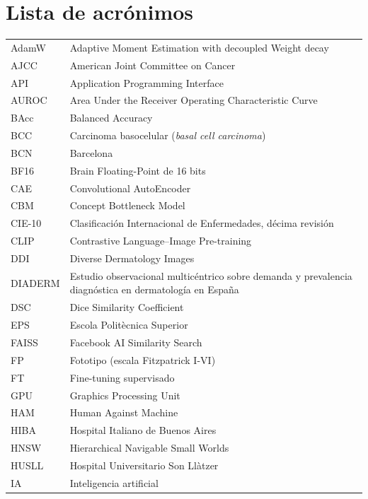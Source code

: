 
\chapter*{Lista de acrónimos}

\begin{tabular}{p{}p{}}
AdamW & Adaptive Moment Estimation with decoupled Weight decay \\
AJCC & American Joint Committee on Cancer \\
API & Application Programming Interface \\
AUROC & Area Under the Receiver Operating Characteristic Curve \\
BAcc & Balanced Accuracy \\
BCC & Carcinoma basocelular (\emph{basal cell carcinoma}) \\
BCN & Barcelona \\
BF16 & Brain Floating-Point de 16 bits \\
CAE & Convolutional AutoEncoder \\
CBM & Concept Bottleneck Model \\
CIE-10 & Clasificación Internacional de Enfermedades, décima revisión \\
CLIP & Contrastive Language--Image Pre-training \\
DDI & Diverse Dermatology Images \\
DIADERM & Estudio observacional multicéntrico sobre demanda y prevalencia diagnóstica en dermatología en España \\
DSC & Dice Similarity Coefficient \\
EPS & Escola Politècnica Superior \\
FAISS & Facebook AI Similarity Search \\
FP & Fototipo (escala Fitzpatrick I-VI) \\
FT & Fine-tuning supervisado \\
GPU & Graphics Processing Unit \\
HAM & Human Against Machine \\
HIBA & Hospital Italiano de Buenos Aires \\
HNSW & Hierarchical Navigable Small Worlds \\
HUSLL & Hospital Universitario Son Llàtzer \\
IA & Inteligencia artificial \\

\end{tabular}
